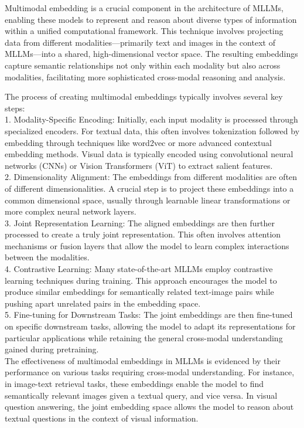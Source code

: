 Multimodal embedding is a crucial component in the architecture of MLLMs, enabling these models to represent and reason about diverse types of information within a unified computational framework. This technique involves projecting data from different modalities—primarily text and images in the context of MLLMs—into a shared, high-dimensional vector space. The resulting embeddings capture semantic relationships not only within each modality but also across modalities, facilitating more sophisticated cross-modal reasoning and analysis.

The process of creating multimodal embeddings typically involves several key steps:
\\
1. Modality-Specific Encoding: Initially, each input modality is processed through specialized encoders. For textual data, this often involves tokenization followed by embedding through techniques like word2vec or more advanced contextual embedding methods. Visual data is typically encoded using convolutional neural networks (CNNs) or Vision Transformers (ViT) to extract salient features.
\\
2. Dimensionality Alignment: The embeddings from different modalities are often of different dimensionalities. A crucial step is to project these embeddings into a common dimensional space, usually through learnable linear transformations or more complex neural network layers.
\\
3. Joint Representation Learning: The aligned embeddings are then further processed to create a truly joint representation. This often involves attention mechanisms or fusion layers that allow the model to learn complex interactions between the modalities.
\\
4. Contrastive Learning: Many state-of-the-art MLLMs employ contrastive learning techniques during training. This approach encourages the model to produce similar embeddings for semantically related text-image pairs while pushing apart unrelated pairs in the embedding space.
\\
5. Fine-tuning for Downstream Tasks: The joint embeddings are then fine-tuned on specific downstream tasks, allowing the model to adapt its representations for particular applications while retaining the general cross-modal understanding gained during pretraining.
\\
The effectiveness of multimodal embeddings in MLLMs is evidenced by their performance on various tasks requiring cross-modal understanding. For instance, in image-text retrieval tasks, these embeddings enable the model to find semantically relevant images given a textual query, and vice versa. In visual question answering, the joint embedding space allows the model to reason about textual questions in the context of visual information.

